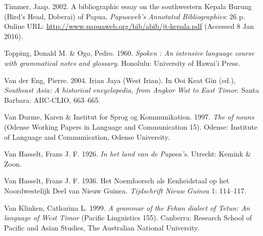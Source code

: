 \begin{styleCitaviBibliographyEntry}
Timmer, Jaap. 2002. A bibliographic essay on the southwestern Kepala Burung (Bird’s Head, Doberai) of Papua. \textit{Papuaweb’s Annotated Bibliographies}: 26 p. Online URL: \url{http://www.papuaweb.org/bib/abib/jt-kepala.pdf} (Accessed 8 Jan 2016).
\end{styleCitaviBibliographyEntry}

\begin{styleCitaviBibliographyEntry}
Topping, Donald M. \& Ogo, Pedro. 1960. \textit{Spoken : An intensive language course with grammatical notes and glossary}. Honolulu: University of Hawai’i Press.
\end{styleCitaviBibliographyEntry}

\begin{styleCitaviBibliographyEntry}
Van der Eng, Pierre. 2004. Irian Jaya (West Irian). In Ooi Keat Gin (ed.), \textit{Southeast Asia: A historical encyclopedia, from Angkor Wat to East Timor}. Santa Barbara: ABC-CLIO, 663–665.
\end{styleCitaviBibliographyEntry}

\begin{styleCitaviBibliographyEntry}
Van Durme, Karen \& Institut for Sprog og Kommunikation. 1997. \textit{The  of nouns} (Odense Working Papers in Language and Communication 15). Odense: Institute of Language and Communication, Odense University.
\end{styleCitaviBibliographyEntry}

\begin{styleCitaviBibliographyEntry}
Van Hasselt, Frans J. F. 1926. \textit{In het land van de Papoea’s}. Utrecht: Kemink \& Zoon.
\end{styleCitaviBibliographyEntry}

\begin{styleCitaviBibliographyEntry}
Van Hasselt, Frans J. F. 1936. Het Noemfoorsch als Eenheidstaal op het Noordwestelijk Deel van Nieuw Guinea. \textit{Tijdschrift Nieuw Guinea} 1: 114–117.
\end{styleCitaviBibliographyEntry}

\begin{styleCitaviBibliographyEntry}
Van Klinken, Catharina L. 1999. \textit{A grammar of the Fehan dialect of Tetun: An  language of West Timor} (Pacific Linguistics 155). Canberra: Research School of Pacific and Asian Studies, The Australian National University.
\end{styleCitaviBibliographyEntry}

